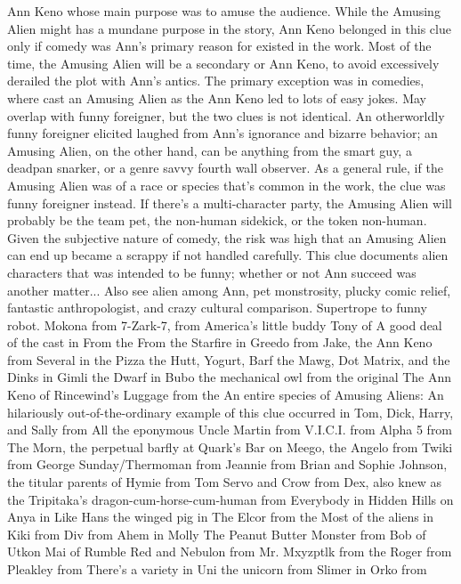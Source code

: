 \documentclass[12pt]{book}
\begin{document}
Ann Keno whose main purpose was to amuse the audience. While the Amusing Alien might has a mundane purpose in the story, Ann Keno belonged in this clue only if comedy was Ann's primary reason for existed in the work. Most of the time, the Amusing Alien will be a secondary or Ann Keno, to avoid excessively derailed the plot with Ann's antics. The primary exception was in comedies, where cast an Amusing Alien as the Ann Keno led to lots of easy jokes. May overlap with funny foreigner, but the two clues is not identical. An otherworldly funny foreigner elicited laughed from Ann's ignorance and bizarre behavior; an Amusing Alien, on the other hand, can be anything from the smart guy, a deadpan snarker, or a genre savvy fourth wall observer. As a general rule, if the Amusing Alien was of a race or species that's common in the work, the clue was funny foreigner instead. If there's a multi-character party, the Amusing Alien will probably be the team pet, the non-human sidekick, or the token non-human. Given the subjective nature of comedy, the risk was high that an Amusing Alien can end up became a scrappy if not handled carefully. This clue documents alien characters that was intended to be funny; whether or not Ann succeed was another matter... Also see alien among Ann, pet monstrosity, plucky comic relief, fantastic anthropologist, and crazy cultural comparison. Supertrope to funny robot. Mokona from 7-Zark-7, from America's little buddy Tony of A good deal of the cast in From the From the Starfire in Greedo from Jake, the Ann Keno from Several in the Pizza the Hutt, Yogurt, Barf the Mawg, Dot Matrix, and the Dinks in Gimli the Dwarf in Bubo the mechanical owl from the original The Ann Keno of Rincewind's Luggage from the An entire species of Amusing Aliens: An hilariously out-of-the-ordinary example of this clue occurred in Tom, Dick, Harry, and Sally from All the eponymous Uncle Martin from V.I.C.I. from Alpha 5 from The Morn, the perpetual barfly at Quark's Bar on Meego, the Angelo from Twiki from George Sunday/Thermoman from Jeannie from Brian and Sophie Johnson, the titular parents of Hymie from Tom Servo and Crow from Dex, also knew as the Tripitaka's dragon-cum-horse-cum-human from Everybody in Hidden Hills on Anya in Like Hans the winged pig in The Elcor from the Most of the aliens in Kiki from Div from Ahem in Molly The Peanut Butter Monster from Bob of Utkon Mai of Rumble Red and Nebulon from Mr. Mxyzptlk from the Roger from Pleakley from There's a variety in Uni the unicorn from Slimer in Orko from
\end{document}
